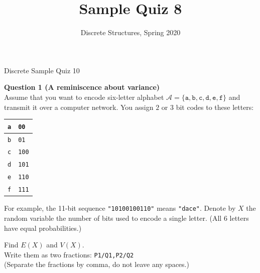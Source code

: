 \documentclass[jou]{apa6}
\title{Sample Quiz 8}
\author{Discrete Structures, Spring 2020}
\affiliation{RBS}
\begin{document}
\thispagestyle{empty}

\twocolumn
{\Large Discrete Sample Quiz 10}

\vspace{6pt}
{\bf Question 1 (A reminiscence about variance)}\\
Assume that you want to encode six-letter alphabet 
$\mathcal{A} = \{ \mathtt{a}, \mathtt{b}, \mathtt{c}, \mathtt{d}, \mathtt{e}, \mathtt{f} \}$
and transmit it over a computer network.
You assign $2$ or $3$ bit codes to these letters: 

\begin{tabular}{|l|l|} \hline
{\tt a} & {\tt 00} \\ \hline
{\tt b} & {\tt 01} \\ \hline
{\tt c} & {\tt 100} \\ \hline
{\tt d} & {\tt 101} \\ \hline
{\tt e} & {\tt 110} \\ \hline
{\tt f} & {\tt 111} \\ \hline
\end{tabular}

For example, the 11-bit sequence {\tt "10100100110"} means {\tt "dace"}.
Denote by $X$ the random variable \textendash{} the number of 
bits used to encode a single letter. (All $6$ letters have 
equal probabilities.)

Find $E(X)$ and $V(X)$.\\
Write them as two fractions: {\tt P1/Q1,P2/Q2}\\
(Separate the fractions by comma, 
do not leave any spaces.)
\end{document}
